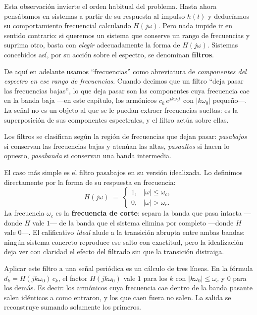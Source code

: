\documentclass[class=book, crop=false]{standalone}
\begin{document}
Esta observación invierte el orden habitual del problema. Hasta ahora pensábamos en sistemas a partir de su respuesta al impulso $h(t)$ y deducíamos su comportamiento frecuencial calculando $H(j\omega)$. Pero nada impide ir en sentido contrario: si queremos un sistema que conserve un rango de frecuencias y suprima otro, basta con \emph{elegir} adecuadamente la forma de $H(j\omega)$. Sistemas concebidos así, por su acción sobre el espectro, se denominan \textbf{filtros}.

\begin{nota}
De aquí en adelante usamos ``frecuencias'' como abreviatura de \emph{componentes del espectro en ese rango de frecuencias}. Cuando decimos que un filtro ``deja pasar las frecuencias bajas'', lo que deja pasar son las componentes cuya frecuencia cae en la banda baja ---en este capítulo, los armónicos $c_k\,e^{jk\omega_0 t}$ con $|k\omega_0|$ pequeño---. La señal no es un objeto al que se le puedan extraer frecuencias sueltas: es la superposición de sus componentes espectrales, y el filtro actúa sobre ellas.
\end{nota}

Los filtros se clasifican según la región de frecuencias que dejan pasar: \emph{pasabajos} si conservan las frecuencias bajas y atenúan las altas, \emph{pasaaltos} si hacen lo opuesto, \emph{pasabanda} si conservan una banda intermedia.

El caso más simple es el filtro pasabajos en su versión idealizada. Lo definimos directamente por la forma de su respuesta en frecuencia:
\begin{equation}
    H(j\omega) \;=\;
    \begin{cases}
        1, & |\omega| \leq \omega_c, \\
        0, & |\omega| > \omega_c.
    \end{cases}
    \label{eq:pasabajos_ideal}
\end{equation}
La frecuencia $\omega_c$ es la \textbf{frecuencia de corte}: separa la banda que pasa intacta ---donde $H$ vale $1$--- de la banda que el sistema elimina por completo ---donde $H$ vale $0$---. El calificativo \emph{ideal} alude a la transición abrupta entre ambas bandas: ningún sistema concreto reproduce ese salto con exactitud, pero la idealización deja ver con claridad el efecto del filtrado sin que la transición distraiga.

Aplicar este filtro a una señal periódica es un cálculo de tres líneas. En la fórmula $d_k = H(jk\omega_0)\,c_k$, el factor $H(jk\omega_0)$ vale $1$ para los $k$ con $|k\omega_0| \leq \omega_c$ y $0$ para los demás. Es decir: los armónicos cuya frecuencia cae dentro de la banda pasante salen idénticos a como entraron, y los que caen fuera no salen. La salida se reconstruye sumando solamente los primeros.
\end{document}
